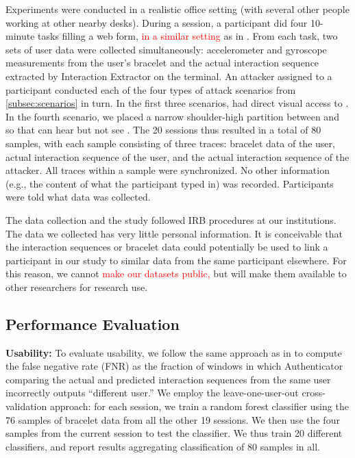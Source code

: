 \documentclass[conference]{IEEEtran}
\newcommand{\attacker}{\xspace}
\newcommand{\victim}{\xspace}
\newcommand\changeMika[1]{\textcolor{red}{#1}}
\newcommand\changeAsokan[1]{\textcolor{red}{#1}}
\newcommand\changeMika[1]{{#1}}
\newcommand\changeAsokan[1]{{#1}}
\begin{document}
Experiments were conducted in a realistic office setting (with several
other people working at other nearby desks). During a session, a participant did four
10-minute tasks filling a web form, \changeMika{in a similar setting} as in
\cite{mare2014zebra}. From each task, two sets of user data were collected
simultaneously: accelerometer and gyroscope measurements from the user's
bracelet and the actual interaction sequence extracted by Interaction Extractor
on the terminal.  An attacker \attacker assigned to a participant \victim
conducted each of the four types of attack scenarios from
\ref{subsec:scenarios} in turn. In the first three scenarios, \attacker had direct visual
access to \victim. In the fourth scenario, we placed a narrow shoulder-high partition
between \victim and \attacker so that \attacker can hear but not see \victim.
The 20 sessions thus resulted in a total of 80 samples, with each sample
consisting of three traces: bracelet data of the user, actual interaction
sequence of the user, and the actual interaction sequence of the attacker. All
traces within a sample were synchronized. No other information (e.g., the
content of what the participant typed in) was recorded. Participants were told
what data was collected.


The data collection and the study followed IRB procedures at our institutions.
The data we collected has very little personal information. It is
conceivable that the interaction sequences or bracelet data could potentially
be used to link a participant in our study to similar data from the same
participant elsewhere. For this reason, we cannot \changeAsokan{make our datasets 
 public,} but will make them available to other researchers for research use.








 








\subsection{Performance Evaluation}
\label{sec:performance_evaluation}

\textbf{Usability:} To evaluate {usability}, we follow the same approach as in \cite{mare2014zebra} to compute the false negative rate (FNR) as the fraction of windows in which Authenticator comparing the actual and predicted interaction sequences from the same user incorrectly outputs ``different user.''
We 
employ the leave-one-user-out cross-validation approach: for each session, 
we train a random forest classifier using the 76 samples of bracelet data from all the other 19 sessions. We then use the four samples from the current session to test the classifier. We thus train 20 different classifiers, and report results aggregating classification of 80 samples in all.
\end{document}
